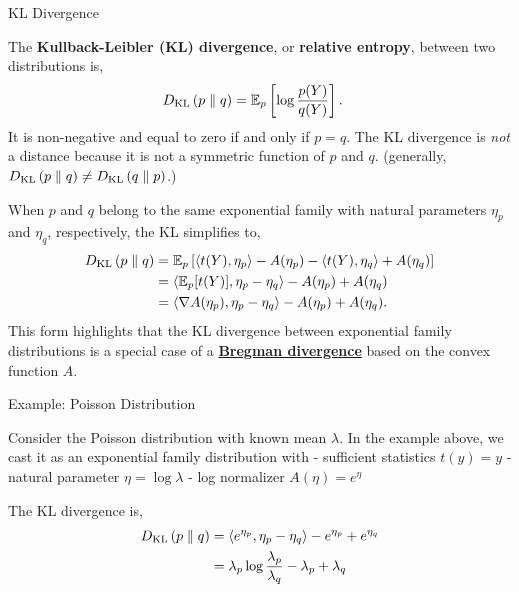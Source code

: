\documentclass[aspectratio=169]{beamer}
\begin{document}
\begin{frame}[t,allowframebreaks]{KL Divergence}\label{kl-divergence}

The \textbf{Kullback-Leibler (KL) divergence}, or \textbf{relative
entropy}, between two distributions is, \begin{align*}
D_{\textrm{KL}}\left(p\;\|\;q\right) &= \mathbb{E}_{p}\left[\log \frac{p(Y)}{q(Y)} \right].
\end{align*} It is non-negative and equal to zero if and only if
\(p = q\). The KL divergence is \emph{not} a distance because it is not
a symmetric function of \(p\) and \(q\). (generally,
\(D_{\textrm{KL}}\left(p\;\|\;q\right) \neq D_{\textrm{KL}}\left(q\;\|\;p\right)\).)

When \(p\) and \(q\) belong to the same exponential family with natural
parameters \(\eta_p\) and \(\eta_q\), respectively, the KL simplifies
to, \begin{align*}
D_{\textrm{KL}}\left(p\;\|\;q\right) 
&= \mathbb{E}_{p}\left[ \langle t(Y), \eta_p \rangle - A(\eta_p) - \langle t(Y), \eta_q \rangle + A(\eta_q) \right] \\
&= \langle \mathbb{E}_{p} [t(Y)], \eta_p - \eta_q \rangle - A(\eta_p) + A(\eta_q) \\
&= \langle \nabla A(\eta_p), \eta_p - \eta_q \rangle - A(\eta_p) + A(\eta_q).
\end{align*} This form highlights that the KL divergence between
exponential family distributions is a special case of a
\href{https://en.wikipedia.org/wiki/Bregman_divergence}{\textbf{Bregman
divergence}} based on the convex function \(A\).
\end{frame}

\begin{frame}[t,allowframebreaks]{Example: Poisson Distribution}

Consider the Poisson distribution with known mean \(\lambda\). In the
example above, we cast it as an exponential family distribution with -
sufficient statistics \(t(y) = y\) - natural parameter
\(\eta = \log \lambda\) - log normalizer \(A(\eta) = e^\eta\)

The KL divergence is,
\begin{align*}
D_{\textrm{KL}}\left(p\;\|\;q\right) 
&= \langle e^{\eta_p}, \eta_p - \eta_q \rangle - e^{\eta_p} + e^{\eta_q} \\
&= \lambda_p \log \frac{\lambda_p}{\lambda_q} - \lambda_p + \lambda_q \\
\end{align*} 
\end{frame}


\end{document}
